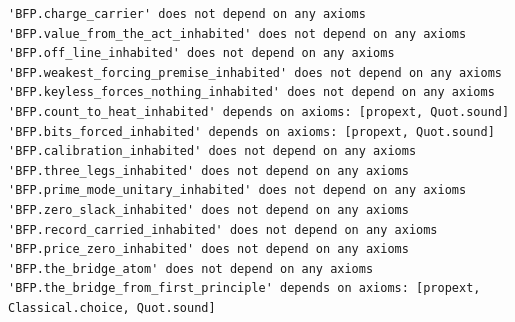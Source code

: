 \documentclass[10pt,twocolumn]{article}
\begin{document}
\begin{Verbatim}
'BFP.charge_carrier' does not depend on any axioms
'BFP.value_from_the_act_inhabited' does not depend on any axioms
'BFP.off_line_inhabited' does not depend on any axioms
'BFP.weakest_forcing_premise_inhabited' does not depend on any axioms
'BFP.keyless_forces_nothing_inhabited' does not depend on any axioms
'BFP.count_to_heat_inhabited' depends on axioms: [propext, Quot.sound]
'BFP.bits_forced_inhabited' depends on axioms: [propext, Quot.sound]
'BFP.calibration_inhabited' does not depend on any axioms
'BFP.three_legs_inhabited' does not depend on any axioms
'BFP.prime_mode_unitary_inhabited' does not depend on any axioms
'BFP.zero_slack_inhabited' does not depend on any axioms
'BFP.record_carried_inhabited' does not depend on any axioms
'BFP.price_zero_inhabited' does not depend on any axioms
'BFP.the_bridge_atom' does not depend on any axioms
'BFP.the_bridge_from_first_principle' depends on axioms: [propext, Classical.choice, Quot.sound]
\end{Verbatim}
\end{document}
